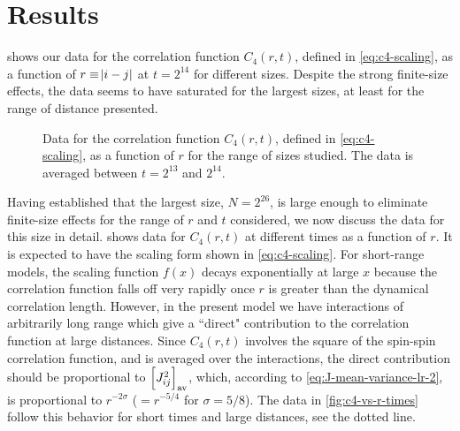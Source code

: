\section{Results}

 shows our data for the correlation function $C_4(r,t)$,
defined in \cref{eq:c4-scaling}, as a function of $r\equiv\abs{i-j}$ at
$t=2^{14}$ for different sizes. Despite the strong finite-size effects, the data
seems to have saturated for the largest sizes, at least for the range of distance
presented.
\begin{figure}
  \centering
  
  \caption[
    Data for the correlation function averaged between $t=2^{13}$ and $2^{14}$
    for different sizes of the 1-d long-range diluted spin glass with
    $\sigma=5/8$ at $T=0.4T_c$.
  ]
  {
    Data for the correlation function $C_4(r,t)$, defined in \cref{eq:c4-scaling},
    as a function of $r$ for the range of sizes studied. The data is averaged
    between $t=2^{13}$ and $2^{14}$.
  } \label{fig:c4-vs-r-sizes}
\end{figure}

Having established that the largest size, $N=2^{26}$, is large enough to
eliminate finite-size effects for the range of $r$ and $t$ considered, we now
discuss the data for this size in detail.  shows data
for $C_4(r,t)$ at different times as a function of $r$. It is expected to have
the scaling form shown in \cref{eq:c4-scaling}. For short-range models, the
scaling function $f(x)$ decays exponentially at large $x$ because the
correlation function falls off very rapidly once $r$ is greater than the
dynamical correlation length. However, in the present model we have
interactions of arbitrarily long range which give a ``direct" contribution to
the correlation function at large distances. Since $C_4(r,t)$ involves the
square of the spin-spin correlation function, and is averaged over the
interactions, the direct contribution should be proportional to
$\left[J_{ij}^2\right]_{\mathrm{av}}$, which, according to \cref{eq:J-mean-variance-lr-2}, is
proportional to $r^{-2\sigma}$ ($=r^{-5/4}$ for $\sigma=5/8$). The data in
\cref{fig:c4-vs-r-times} follow this behavior for short times and large
distances, see the dotted line.

